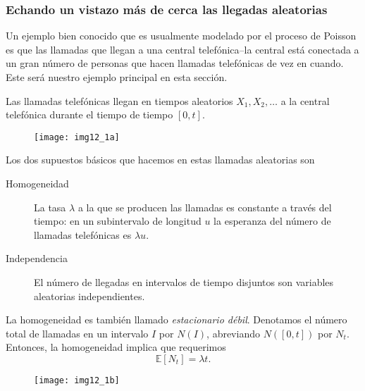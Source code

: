 \subsubsection{Echando un vistazo más de cerca las llegadas aleatorias}

	Un ejemplo bien conocido que es usualmente modelado por el proceso de Poisson es que las llamadas que llegan a una central telefónica--la central está conectada a un gran número de personas que hacen llamadas telefónicas de vez en cuando. Este será nuestro ejemplo principal en esta sección.

	\noindent Las llamadas telefónicas llegan en tiempos aleatorios $X_{1}, X_{2}, \ldots$ a la central telefónica durante el tiempo de tiempo $\left[0,t\right]$.

	\begin{figure}[!ht]
		\centering
		\texttt{[image: img12\_1a]}
		\caption*{}
	\end{figure}

	\noindent Los dos supuestos básicos que hacemos en estas llamadas aleatorias son
	\begin{description}
		\item[Homogeneidad] La tasa $\lambda$ a la que se producen las llamadas es constante a través del tiempo: en un subintervalo de longitud $u$ la esperanza del número de llamadas telefónicas es $\lambda u$.
		\item[Independencia] El número de llegadas en intervalos de tiempo disjuntos son variables aleatorias independientes.
	\end{description}

	La homogeneidad es también llamado \textit{estacionario débil}. Denotamos el número total de llamadas en un intervalo $I$ por $N\left(I\right)$, abreviando $N\left(\left[0,t\right]\right)$ por $N_{t}$. Entonces, la homogeneidad implica que requerimos
	\[
		\mathds{E}\left[N_{t}\right]=\lambda t.
	\]

	\begin{figure}[!ht]
		\centering
		\texttt{[image: img12\_1b]}
		\caption*{}
	\end{figure}

